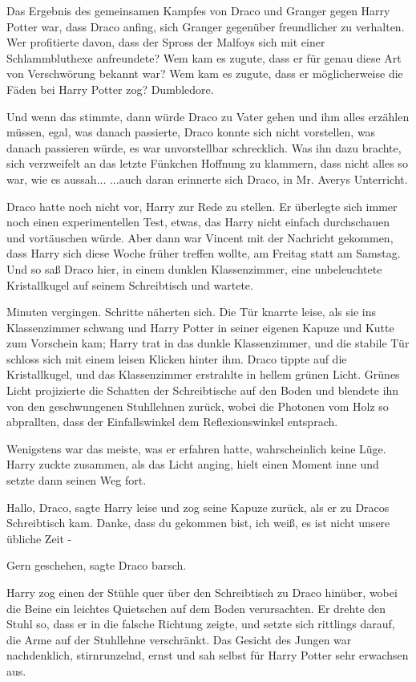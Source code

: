 Das Ergebnis des gemeinsamen Kampfes von Draco und Granger gegen Harry Potter
war, dass Draco anfing, sich Granger gegenüber freundlicher zu verhalten. Wer
profitierte davon, dass der Spross der Malfoys sich mit einer Schlammbluthexe
anfreundete? Wem kam es zugute, dass er für genau diese Art von Verschwörung
bekannt war? Wem kam es zugute, dass er möglicherweise die Fäden bei Harry
Potter zog? Dumbledore.

Und wenn das stimmte, dann würde Draco zu Vater gehen und ihm alles erzählen
müssen, egal, was danach passierte, Draco konnte sich nicht vorstellen, was
danach passieren würde, es war unvorstellbar schrecklich. Was ihn dazu brachte,
sich verzweifelt an das letzte Fünkchen Hoffnung zu klammern, dass nicht alles
so war, wie es aussah... ...auch daran erinnerte sich Draco, in Mr. Averys
Unterricht.

Draco hatte noch nicht vor, Harry zur Rede zu stellen. Er überlegte sich immer
noch einen experimentellen Test, etwas, das Harry nicht einfach durchschauen und
vortäuschen würde. Aber dann war Vincent mit der Nachricht gekommen, dass Harry
sich diese Woche früher treffen wollte, am Freitag statt am Samstag. Und so saß
Draco hier, in einem dunklen Klassenzimmer, eine unbeleuchtete Kristallkugel auf
seinem Schreibtisch und wartete.

Minuten vergingen. Schritte näherten sich. Die Tür knarrte leise, als sie ins
Klassenzimmer schwang und Harry Potter in seiner eigenen Kapuze und Kutte zum
Vorschein kam; Harry trat in das dunkle Klassenzimmer, und die stabile Tür
schloss sich mit einem leisen Klicken hinter ihm. Draco tippte auf die
Kristallkugel, und das Klassenzimmer erstrahlte in hellem grünen Licht. Grünes
Licht projizierte die Schatten der Schreibtische auf den Boden und blendete ihn
von den geschwungenen Stuhllehnen zurück, wobei die Photonen vom Holz so
abprallten, dass der Einfallswinkel dem Reflexionswinkel entsprach.

Wenigstens war das meiste, was er erfahren hatte, wahrscheinlich keine Lüge.
Harry zuckte zusammen, als das Licht anging, hielt einen Moment inne und setzte
dann seinen Weg fort.

\glqq{}Hallo, Draco\grqq{}, sagte Harry leise und zog seine Kapuze zurück, als er
zu Dracos Schreibtisch kam. \glqq{}Danke, dass du gekommen bist, ich weiß, es ist
nicht unsere übliche Zeit -\grqq{}

\glqq{}Gern geschehen\grqq{}, sagte Draco barsch.

Harry zog einen der Stühle quer über den Schreibtisch zu Draco hinüber, wobei
die Beine ein leichtes Quietschen auf dem Boden verursachten. Er drehte den
Stuhl so, dass er in die falsche Richtung zeigte, und setzte sich rittlings
darauf, die Arme auf der Stuhllehne verschränkt. Das Gesicht des Jungen war
nachdenklich, stirnrunzelnd, ernst und sah selbst für Harry Potter sehr
erwachsen aus.

